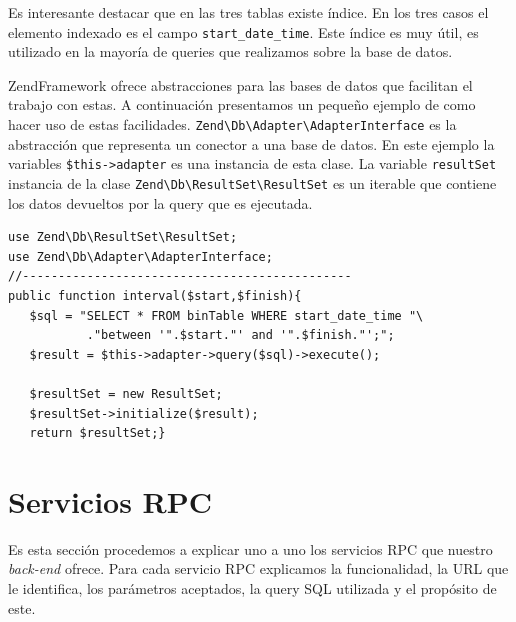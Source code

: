 	\par 
	Es interesante destacar que en las tres tablas existe índice. En los tres casos el elemento indexado es el campo \texttt{start\_date\_time}.
	Este índice es muy útil, es utilizado en la mayoría de queries que realizamos sobre la base de datos. 
	\par
	ZendFramework ofrece abstracciones para las bases de datos que facilitan el trabajo con estas. A continuación presentamos un pequeño ejemplo
	de como hacer uso de estas facilidades. \texttt{Zend\textbackslash Db\textbackslash Adapter\textbackslash AdapterInterface} es la abstracción
	que representa un conector a una base de datos. En este ejemplo la variables \texttt{\$this->adapter} es una instancia de esta clase. La
	variable \texttt{resultSet} instancia de la clase \texttt{Zend\textbackslash Db\textbackslash ResultSet\textbackslash ResultSet} es un
	iterable que contiene los datos devueltos por la query que es ejecutada.
	\begin{lstlisting}[style=myPhp]
use Zend\Db\ResultSet\ResultSet;
use Zend\Db\Adapter\AdapterInterface;
//----------------------------------------------
public function interval($start,$finish){
   $sql = "SELECT * FROM binTable WHERE start_date_time "\
           ."between '".$start."' and '".$finish."';";
   $result = $this->adapter->query($sql)->execute();

   $resultSet = new ResultSet;
   $resultSet->initialize($result);
   return $resultSet;}
	\end{lstlisting}
\section{Servicios RPC}
	Es esta sección procedemos a explicar uno a uno los servicios RPC que nuestro \emph{back-end} ofrece. Para cada servicio RPC explicamos la
	funcionalidad, la URL que le identifica, los parámetros aceptados, la query SQL utilizada y el propósito de este.
